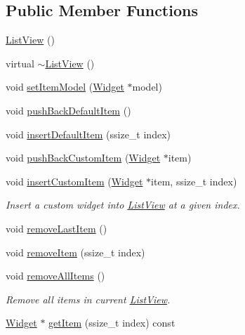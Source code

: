\subsection*{Public Member Functions}
\begin{DoxyCompactItemize}
\item 
\hyperlink{classui_1_1ListView_a51ad2443dcfbd766ace32060e102f706}{List\+View} ()
\item 
virtual \hyperlink{classui_1_1ListView_acd8c9c5b0bd4ef6166c056798665c08d}{$\sim$\+List\+View} ()
\item 
void \hyperlink{classui_1_1ListView_ab925e8282e44c05155b27b27d4a05808}{set\+Item\+Model} (\hyperlink{classui_1_1Widget}{Widget} $\ast$model)
\item 
void \hyperlink{classui_1_1ListView_a9ef7771758b5ffa248ac88d3bff471fe}{push\+Back\+Default\+Item} ()
\item 
void \hyperlink{classui_1_1ListView_aca5f63e916a28a84842f8a1bc4320cdb}{insert\+Default\+Item} (ssize\+\_\+t index)
\item 
void \hyperlink{classui_1_1ListView_afb0981c8954c749a31ca95d38b22de2a}{push\+Back\+Custom\+Item} (\hyperlink{classui_1_1Widget}{Widget} $\ast$item)
\item 
void \hyperlink{classui_1_1ListView_ab6e5f75b2cdf36871d994fccd55c75ae}{insert\+Custom\+Item} (\hyperlink{classui_1_1Widget}{Widget} $\ast$item, ssize\+\_\+t index)
\begin{DoxyCompactList}\small\item\em Insert a custom widget into \hyperlink{classui_1_1ListView}{List\+View} at a given index. \end{DoxyCompactList}\item 
void \hyperlink{classui_1_1ListView_ac1f87fcfe590bd09123528ef19885cdb}{remove\+Last\+Item} ()
\item 
void \hyperlink{classui_1_1ListView_a71d47608a35c7e6b7c4d986916998baa}{remove\+Item} (ssize\+\_\+t index)
\item 
\mbox{\label{classui_1_1ListView_ae4bc74035bed0c50bac28562479630c9}} 
void \hyperlink{classui_1_1ListView_ae4bc74035bed0c50bac28562479630c9}{remove\+All\+Items} ()
\begin{DoxyCompactList}\small\item\em Remove all items in current \hyperlink{classui_1_1ListView}{List\+View}. \end{DoxyCompactList}\item 
\hyperlink{classui_1_1Widget}{Widget} $\ast$ \hyperlink{classui_1_1ListView_adc14ba59d9dfa3064a7d9e77fadddd38}{get\+Item} (ssize\+\_\+t index) const

\end{DoxyCompactItemize}
